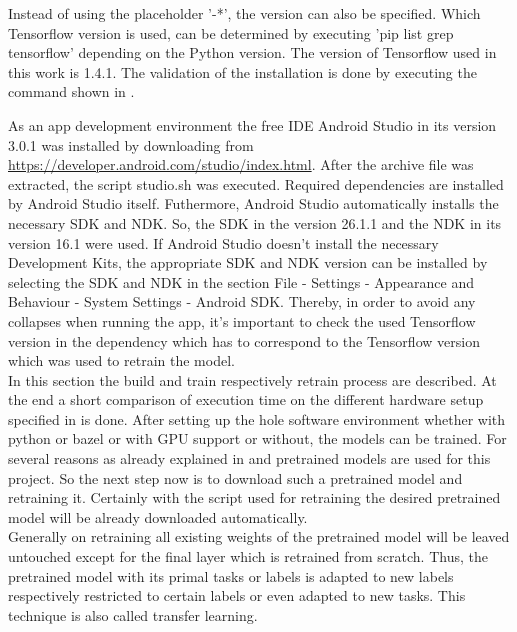 Instead of using the placeholder '-*', the version can also be specified. Which Tensorflow version is used, can be determined by executing 'pip list \big \vert grep tensorflow' depending on the Python version. The version of Tensorflow used in this work is 1.4.1. The validation of the installation is done by executing the command shown in  \citep{TensorflowBazel}.

As an app development environment the free IDE Android Studio in its version 3.0.1 was installed by downloading from \url{https://developer.android.com/studio/index.html}. After the archive file was extracted, the script studio.sh was executed. Required dependencies are installed by Android Studio itself. Futhermore, Android Studio automatically installs the necessary SDK and NDK. So, the SDK in the version 26.1.1 and the NDK in its version 16.1 were used. If Android Studio doesn't install the necessary Development Kits, the appropriate SDK and NDK version can be installed by selecting the SDK and NDK in the section File - Settings - Appearance and Behaviour - System Settings - Android SDK. Thereby, in order to avoid any collapses when running the app, it's important to check the used Tensorflow version in the dependency which has to correspond to the Tensorflow version which was used to retrain the model.\\





In this section the build and train respectively retrain process are described. At the end a short comparison of execution time on the different hardware setup specified in  is done.
After setting up the hole software environment whether with python or bazel or with GPU support or without, the models can be trained. For several reasons as already explained in  and  pretrained models are used for this project. So the next step now is to download such a pretrained model and retraining it. Certainly with the script used for retraining the desired pretrained model will be already downloaded automatically. \\

Generally on retraining all existing weights of the pretrained model will be leaved untouched except for the final layer which is retrained from scratch. Thus, the pretrained model with its primal tasks or labels is adapted to new labels respectively restricted to certain labels or even adapted to new tasks. This technique is also called transfer learning. \citep{TensorFlowRetrain2017}


